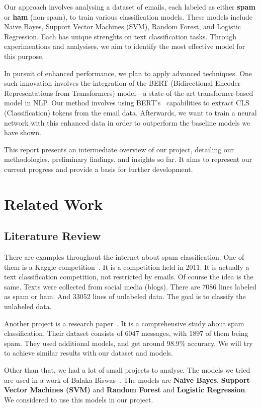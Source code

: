 \documentclass[conference]{IEEEtran}
\begin{document}
Our approach involves analysing a dataset of emails, each labeled as either \textbf{spam} or \textbf{ham} (non-spam), to train various classification models. These models include Naive Bayes, Support Vector Machines (SVM), Random Forest, and Logistic Regression. Each has unique strenghts on text classification tasks. Through experimentions and analysises, we aim to identify the most effective model for this purpose.

In pursuit of enhanced performance, we plan to apply advanced techniques. One such innovation involves the integration of the BERT (Bidirectional Encoder Representations from Transformers) model—a state-of-the-art transformer-based model in NLP. Our method involves using BERT's \cite{bert} capabilities to extract CLS (Classification) tokens from the email data. Afterwards, we want to train a neural network with this enhanced data in order to outperform the baseline models we have shown.

This report presents an intermediate overview of our project, detailing our methodologies, preliminary findings, and insights so far. It aims to represent our current progress and provide a basis for further development.

\section{Related Work}

\subsection{Literature Review}

There are examples throughout the internet about spam classification. One of them is a Kaggle competition \cite{kaggle_competition}. It is a competition held in 2011. It is actually a text classification competition, not restricted by emails. Of course the idea is the same. Texts were collected from social media (blogs). There are 7086 lines labeled as spam or ham. And 33052 lines of unlabeled data. The goal is to classify the unlabeled data.

Another project is a research paper \cite{researchgate}. It is a comprehensive study about spam classification. Their dataset consists of 6047 messages, with 1897 of them being spam. They used additional models, and get around 98.9\% accuracy. We will try to achieve similar results with our dataset and models.

Other than that, we had a lot of small projects to analyse. The models we tried are used in a work of Balaka Biswas \cite{balaka_biswas}. The models are \textbf{Naive Bayes}, \textbf{Support Vector Machines (SVM)} and \textbf{Random Forest} and \textbf{Logistic Regression}. We considered to use this models in our project.
\end{document}
